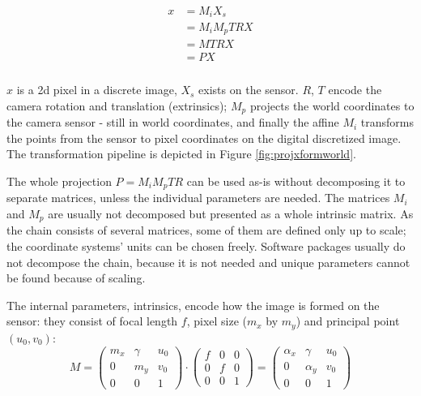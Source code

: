 \begin{align} \label{eq:projxform} \begin{split}
	x
	&= M_i X_s\\
	&= M_i M_p T R X\\
	&= M T R X\\
	&= P X\\
\end{split} \end{align}

$x$ is a 2d pixel in a discrete image, $X_s$ exists on the sensor.
$R$, $T$ encode the camera rotation and translation (extrinsics);
$M_p$ projects the world coordinates to the camera sensor - still in world coordinates, and finally the affine $M_i$ transforms the points from the sensor to pixel coordinates on the digital discretized image.
The transformation pipeline is depicted in Figure \ref{fig:projxformworld}.



The whole projection $P = M_i M_p T R$ can be used as-is without decomposing it to separate matrices, unless the individual parameters are needed.
The matrices $M_i$ and $M_p$ are usually not decomposed but presented as a whole intrinsic matrix.
As the chain consists of several matrices, some of them are defined only up to scale; the coordinate systems' units can be chosen freely.
Software packages usually do not decompose the chain, because it is not needed and unique parameters cannot be found because of scaling.


The internal parameters, intrinsics, encode how the image is formed on the sensor: they consist of focal length $f$, pixel size ($m_x$ by $m_y$) and principal point $(u_0, v_0)$:
\begin{equation}
	M =
	\begin{pmatrix}
		m_x & \gamma & u_0\\
		0   &    m_y & v_0\\
		0   &        0 & 1
	\end{pmatrix}
\cdot
	\begin{pmatrix}
		f & 0 & 0\\
		0 & f & 0\\
		0 & 0 & 1
	\end{pmatrix}
	=
	\begin{pmatrix}
		\alpha_x & \gamma   & u_0\\
		0        & \alpha_y & v_0\\
		0        & 0        & 1
	\end{pmatrix}
\end{equation}

